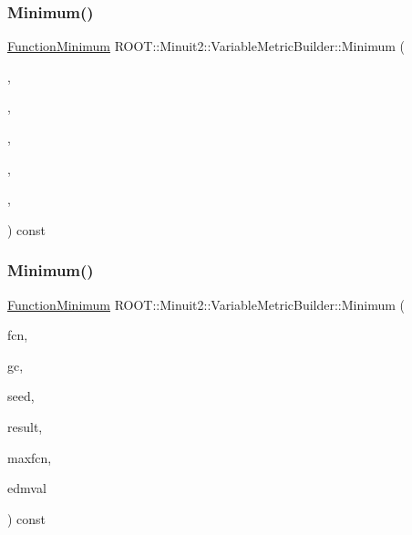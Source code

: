 \subsubsection{\texorpdfstring{Minimum()}{Minimum()}\hspace{0.1cm}{\footnotesize\ttfamily [3/4]}}
{\footnotesize\ttfamily \mbox{\hyperlink{classROOT_1_1Minuit2_1_1FunctionMinimum}{Function\+Minimum}} R\+O\+O\+T\+::\+Minuit2\+::\+Variable\+Metric\+Builder\+::\+Minimum (\begin{DoxyParamCaption}\item[{const \mbox{\hyperlink{classROOT_1_1Minuit2_1_1MnFcn}{Mn\+Fcn}} \&}]{,  }\item[{const \mbox{\hyperlink{classROOT_1_1Minuit2_1_1GradientCalculator}{Gradient\+Calculator}} \&}]{,  }\item[{const \mbox{\hyperlink{classROOT_1_1Minuit2_1_1MinimumSeed}{Minimum\+Seed}} \&}]{,  }\item[{std\+::vector$<$ \mbox{\hyperlink{classROOT_1_1Minuit2_1_1MinimumState}{Minimum\+State}} $>$ \&}]{,  }\item[{unsigned int}]{,  }\item[{double}]{ }\end{DoxyParamCaption}) const}

\mbox{\label{classROOT_1_1Minuit2_1_1VariableMetricBuilder_a6214271e1802f110e94725295f3900fc}} 
\subsubsection{\texorpdfstring{Minimum()}{Minimum()}\hspace{0.1cm}{\footnotesize\ttfamily [4/4]}}
{\footnotesize\ttfamily \mbox{\hyperlink{classROOT_1_1Minuit2_1_1FunctionMinimum}{Function\+Minimum}} R\+O\+O\+T\+::\+Minuit2\+::\+Variable\+Metric\+Builder\+::\+Minimum (\begin{DoxyParamCaption}\item[{const \mbox{\hyperlink{classROOT_1_1Minuit2_1_1MnFcn}{Mn\+Fcn}} \&}]{fcn,  }\item[{const \mbox{\hyperlink{classROOT_1_1Minuit2_1_1GradientCalculator}{Gradient\+Calculator}} \&}]{gc,  }\item[{const \mbox{\hyperlink{classROOT_1_1Minuit2_1_1MinimumSeed}{Minimum\+Seed}} \&}]{seed,  }\item[{std\+::vector$<$ \mbox{\hyperlink{classROOT_1_1Minuit2_1_1MinimumState}{Minimum\+State}} $>$ \&}]{result,  }\item[{unsigned int}]{maxfcn,  }\item[{double}]{edmval }\end{DoxyParamCaption}) const}

